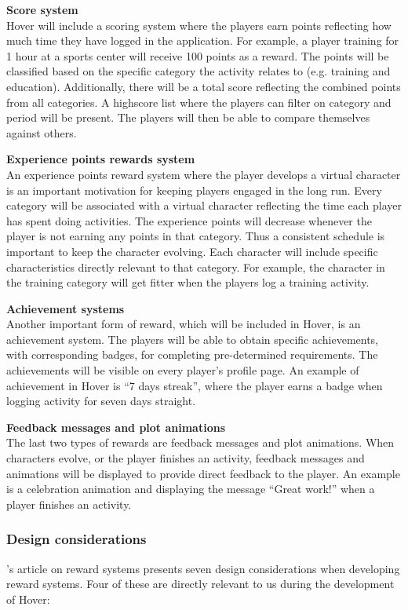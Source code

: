 \documentclass[../Main.tex]{subfiles}
\begin{document}
\textbf{Score system}\\
Hover will include a scoring system where the players earn points reflecting how much time they have logged in the application. For example, a player training for 1 hour at a sports center will receive 100 points as a reward. The points will be classified based on the specific category the activity relates to (e.g. training and education). Additionally, there will be a total score reflecting the combined points from all categories. A highscore list where the players can filter on category and period will be present. The players will then be able to compare themselves against others.

\textbf{Experience points rewards system}\\
An experience points reward system where the player develops a virtual character is an important motivation for keeping players engaged in the long run. Every category will be associated with a virtual character reflecting the time each player has spent doing activities. The experience points will decrease whenever the player is not earning any points in that category. Thus a consistent schedule is important to keep the character evolving. Each character will include specific characteristics directly relevant to that category. For example, the character in the training category will get fitter when the players log a training activity.

\textbf{Achievement systems}\\
Another important form of reward, which will be included in Hover, is an achievement system. The players will be able to obtain specific achievements, with corresponding badges, for completing pre-determined requirements. The achievements will be visible on every player’s profile page. An example of achievement in Hover is “7 days streak”, where the player earns a badge when logging activity for seven days straight.

\textbf{Feedback messages and plot animations}\\
The last two types of rewards are feedback messages and plot animations. When characters evolve, or the player finishes an activity, feedback messages and animations will be displayed to provide direct feedback to the player. An example is a celebration animation and displaying the message “Great work!” when a player finishes an activity.

\subsubsection{Design considerations}
\citeauthor{wang_game_2011}’s article on reward systems presents seven design considerations when developing reward systems. Four of these are directly relevant to us during the development of Hover:
\end{document}
